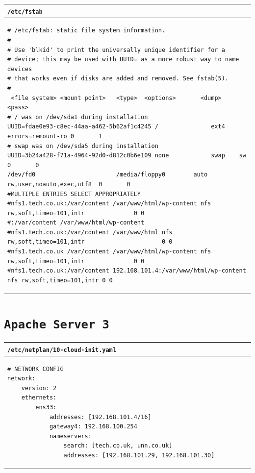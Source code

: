 \documentclass[11pt]{article}
\begin{document}
\begin{table}[ht]
    \begin{tabular}{|p{17.7cm}|} 
        \hline
        \texttt{\textbf{/etc/fstab}}\\ 
        \hline
        \lstset{
                basicstyle=\scriptsize\ttfamily,
              }
              \begin{lstlisting}
# /etc/fstab: static file system information.
#
# Use 'blkid' to print the universally unique identifier for a
# device; this may be used with UUID= as a more robust way to name devices
# that works even if disks are added and removed. See fstab(5).
#
 <file system> <mount point>   <type>  <options>       <dump>  <pass>
# / was on /dev/sda1 during installation
UUID=fdae0e93-c8ec-44aa-a462-5b62af1c4245 /               ext4    errors=remount-ro 0       1
# swap was on /dev/sda5 during installation
UUID=3b24a428-f71a-4964-92d0-d812c0b6e109 none            swap    sw                0       0
/dev/fd0                       /media/floppy0        auto rw,user,noauto,exec,utf8  0       0
#MULTIPLE ENTRIES SELECT APPROPRIATELY
#nfs1.tech.co.uk:/var/content /var/www/html/wp-content nfs  rw,soft,timeo=101,intr              0 0
#:/var/content /var/www/html/wp-content
#nfs1.tech.co.uk:/var/content /var/www/html nfs  rw,soft,timeo=101,intr                      0 0
#nfs1.tech.co.uk /var/content /var/www/html/wp-content nfs  rw,soft,timeo=101,intr              0 0
#nfs1.tech.co.uk:/var/content 192.168.101.4:/var/www/html/wp-content nfs rw,soft,timeo=101,intr 0 0           
        \end{lstlisting}\\
        \hline
    \end{tabular}
\end{table}

\clearpage

\section{\texttt{Apache Server 3}}
\begin{table}[ht]
    \begin{tabular}{|p{17.7cm}|} 
        \hline
        \texttt{\textbf{/etc/netplan/10-cloud-init.yaml}}\\ 
        \hline
        \lstset{
                basicstyle=\scriptsize\ttfamily,
              }
              \begin{lstlisting}
# NETWORK CONFIG
network:
    version: 2
    ethernets:
        ens33:
            addresses: [192.168.101.4/16]
            gateway4: 192.168.100.254
            nameservers:
                search: [tech.co.uk, unn.co.uk]
                addresses: [192.168.101.29, 192.168.101.30]                
        \end{lstlisting}\\
        \hline
    \end{tabular}
\end{table}
\end{document}
